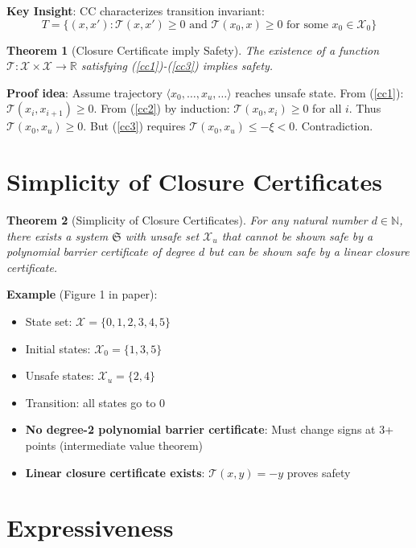 \documentclass{article}
\newtheorem{theorem}{Theorem}
\begin{document}
\textbf{Key Insight}: CC characterizes transition invariant:
\begin{equation}
T = \{(x, x'): \mathcal{T}(x, x') \geq 0 \text{ and } \mathcal{T}(x_0, x) \geq 0 \text{ for some } x_0 \in \mathcal{X}_0\}
\end{equation}

\begin{theorem}[Closure Certificate imply Safety]
The existence of a function $\mathcal{T}: \mathcal{X} \times \mathcal{X} \rightarrow \mathbb{R}$ satisfying (\ref{cc1})-(\ref{cc3}) implies safety.
\end{theorem}

\textbf{Proof idea}: Assume trajectory $\langle x_0, \ldots, x_u, \ldots \rangle$ reaches unsafe state. From (\ref{cc1}): $\mathcal{T}(x_i, x_{i+1}) \geq 0$. From (\ref{cc2}) by induction: $\mathcal{T}(x_0, x_i) \geq 0$ for all $i$. Thus $\mathcal{T}(x_0, x_u) \geq 0$. But (\ref{cc3}) requires $\mathcal{T}(x_0, x_u) \leq -\xi < 0$. Contradiction.

\section{Simplicity of Closure Certificates}

\begin{theorem}[Simplicity of Closure Certificates]
For any natural number $d \in \mathbb{N}$, there exists a system $\mathfrak{S}$ with unsafe set $\mathcal{X}_u$ that cannot be shown safe by a polynomial barrier certificate of degree $d$ but can be shown safe by a linear closure certificate.
\end{theorem}

\textbf{Example} (Figure 1 in paper):
\begin{itemize}
    \item State set: $\mathcal{X} = \{0, 1, 2, 3, 4, 5\}$
    \item Initial states: $\mathcal{X}_0 = \{1, 3, 5\}$
    \item Unsafe states: $\mathcal{X}_u = \{2, 4\}$
    \item Transition: all states go to 0
    \item \textbf{No degree-2 polynomial barrier certificate}: Must change signs at 3+ points (intermediate value theorem)
    \item \textbf{Linear closure certificate exists}: $\mathcal{T}(x, y) = -y$ proves safety
\end{itemize}

\section{Expressiveness}
\end{document}

